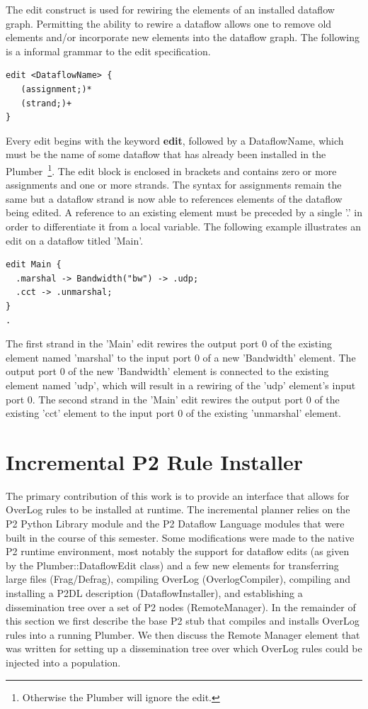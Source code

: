 \documentclass[12pt]{article}
\begin{document}
The edit construct is used for rewiring the elements of an installed dataflow graph. 
Permitting the ability to rewire a dataflow allows one to remove old elements 
and/or incorporate new elements into the dataflow graph. The following is a 
informal grammar to the edit specification.

\begin{verbatim}
edit <DataflowName> {
   (assignment;)*
   (strand;)+
}
\end{verbatim}

Every edit begins with the keyword {\bf edit}, followed by a DataflowName, which
must be the name of some dataflow that has already been installed in the 
Plumber~\footnote{Otherwise the Plumber will ignore the edit.}. The edit
block is enclosed in brackets and contains zero or more assignments and one or
more strands. The syntax for assignments remain the same but a dataflow strand
is now able to references elements of the dataflow being edited. A reference
to an existing element must be preceded by a single '.' in order to differentiate 
it from a local variable. The following example illustrates an edit on a dataflow
titled 'Main'.

\begin{verbatim}
edit Main {
  .marshal -> Bandwidth("bw") -> .udp;
  .cct -> .unmarshal;  
}
.
\end{verbatim}

The first strand in the 'Main' edit rewires the output port $0$ of the existing element
named 'marshal' to the input port $0$ of a new 'Bandwidth' element. 
The output port $0$ of the new 'Bandwidth' element is connected to the existing element
named 'udp', which will result in a rewiring of the 'udp' element's input port $0$. The
second strand in the 'Main' edit rewires the output port $0$ of the existing 'cct' element
to the input port $0$ of the existing 'unmarshal' element.

\section{Incremental P2 Rule Installer}
\label{sec:inc_install}

The primary contribution of this work is to provide an interface that allows for OverLog
rules to be installed at runtime. The incremental planner relies on the P2 Python Library
module and the P2 Dataflow Language modules that were built in the course of this
semester. Some modifications were made to the native P2 runtime environment, most
notably the support for dataflow edits (as given by the Plumber::DataflowEdit class) and
a few new elements for transferring large files (Frag/Defrag), compiling OverLog 
(OverlogCompiler), compiling and installing a P2DL description (DataflowInstaller), and
establishing a dissemination tree over a set of P2 nodes (RemoteManager). 
In the remainder of this section we first describe the base P2 stub that compiles and installs
OverLog rules into a running Plumber. We then discuss the Remote Manager element that
was written for setting up a dissemination tree over which OverLog rules could be injected
into a population. 
\end{document}
